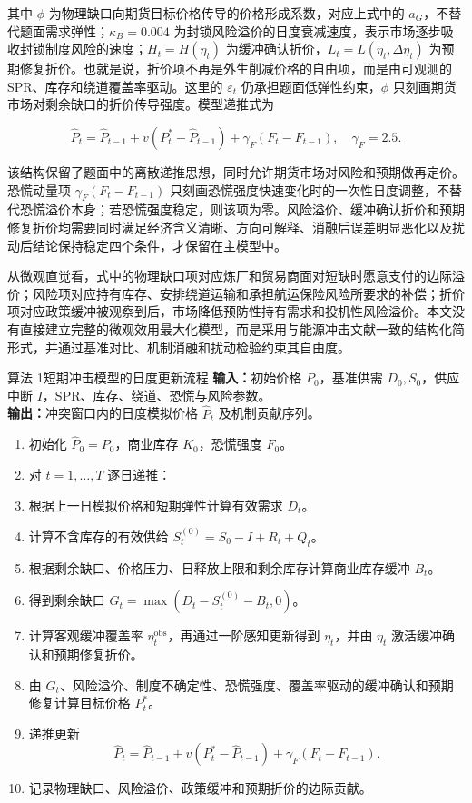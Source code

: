其中 $\phi$ 为物理缺口向期货目标价格传导的价格形成系数，对应上式中的 \(a_G\)，不替代题面需求弹性；$\kappa_B=0.004$ 为封锁风险溢价的日度衰减速度，表示市场逐步吸收封锁制度风险的速度；$H_t=H(\eta_t)$ 为缓冲确认折价，$L_t=L(\eta_t,\Delta\eta_t)$ 为预期修复折价。也就是说，折价项不再是外生削减价格的自由项，而是由可观测的 SPR、库存和绕道覆盖率驱动。这里的 \(\varepsilon_t\) 仍承担题面低弹性约束，\(\phi\) 只刻画期货市场对剩余缺口的折价传导强度。模型递推式为

\begin{equation}
  \hat P_t
  =
  \hat P_{t-1}
  + v(P_t^\ast-\hat P_{t-1})
  + \gamma_F(F_t-F_{t-1}),\quad \gamma_F=2.5 .
\end{equation}

该结构保留了题面中的离散递推思想，同时允许期货市场对风险和预期做再定价。恐慌动量项 \(\gamma_F(F_t-F_{t-1})\) 只刻画恐慌强度快速变化时的一次性日度调整，不替代恐慌溢价本身；若恐慌强度稳定，则该项为零。风险溢价、缓冲确认折价和预期修复折价均需要同时满足经济含义清晰、方向可解释、消融后误差明显恶化以及扰动后结论保持稳定四个条件，才保留在主模型中。

从微观直觉看，式中的物理缺口项对应炼厂和贸易商面对短缺时愿意支付的边际溢价；风险项对应持有库存、安排绕道运输和承担航运保险风险所要求的补偿；折价项对应政策缓冲被观察到后，市场降低预防性持有需求和投机性风险溢价。本文没有直接建立完整的微观效用最大化模型，而是采用与能源冲击文献一致的结构化简形式，并通过基准对比、机制消融和扰动检验约束其自由度。

\begin{paperalgobox}{算法 1\quad 短期冲击模型的日度更新流程}
\textbf{输入：}初始价格 \(P_0\)，基准供需 \(D_0,S_0\)，供应中断 \(I\)，SPR、库存、绕道、恐慌与风险参数。\\
\textbf{输出：}冲突窗口内的日度模拟价格 \(\hat P_t\) 及机制贡献序列。

\begin{enumerate}[leftmargin=2.2em,itemsep=0.25em,topsep=0.45em,label=\arabic*.]
  \item 初始化 \(\hat P_0=P_0\)，商业库存 \(K_0\)，恐慌强度 \(F_0\)。
  \item 对 \(t=1,\ldots,T\) 逐日递推：
  \item 根据上一日模拟价格和短期弹性计算有效需求 \(D_t\)。
  \item 计算不含库存的有效供给 \(S_t^{(0)}=S_0-I+R_t+Q_t\)。
  \item 根据剩余缺口、价格压力、日释放上限和剩余库存计算商业库存缓冲 \(B_t\)。
  \item 得到剩余缺口 \(G_t=\max(D_t-S_t^{(0)}-B_t,0)\)。
  \item 计算客观缓冲覆盖率 \(\eta_t^{\mathrm{obs}}\)，再通过一阶感知更新得到 \(\eta_t\)，并由 \(\eta_t\) 激活缓冲确认和预期修复折价。
  \item 由 \(G_t\)、风险溢价、制度不确定性、恐慌强度、覆盖率驱动的缓冲确认和预期修复计算目标价格 \(P_t^\ast\)。
  \item 递推更新
  \[
    \hat P_t=\hat P_{t-1}+v(P_t^\ast-\hat P_{t-1})+\gamma_F(F_t-F_{t-1}) .
  \]
  \item 记录物理缺口、风险溢价、政策缓冲和预期折价的边际贡献。
\end{enumerate}
\end{paperalgobox}
